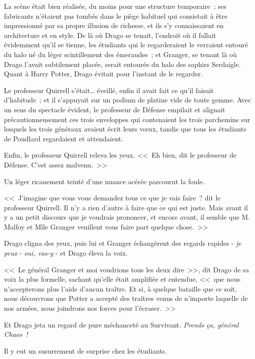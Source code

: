 \later

La scène était bien réalisée, du moins pour une structure temporaire~; ses fabricants n'étaient pas tombés dans le piège habituel qui consistait à être impressionné par sa propre illusion de richesse, et ils s'y connaissaient en architecture et en style. De là où Drago se tenait, l'endroit où il fallait évidemment qu'il se tienne, les étudiants qui le regarderaient le verraient entouré du halo né du léger scintillement des émeraudes~; et Granger, se tenant là où Drago l'avait subtilement placée, serait entourée du halo des saphirs Serdaigle. Quant à Harry Potter, Drago évitait pour l'instant de le regarder.

Le professeur Quirrell s'était… éveillé, enfin il avait fait ce qu'il faisait d'habitude~; et il s'appuyait sur un podium de platine vide de toute gemme. Avec un sens du spectacle évident, le professeur de Défense empilait et alignait précautionneusement ces trois enveloppes qui contenaient les trois parchemins sur lesquels les trois généraux avaient écrit leurs vœux, tandis que tous les étudiants de Poudlard regardaient et attendaient.

Enfin, le professeur Quirrell releva les yeux. <<~Eh bien, dit le professeur de Défense. C'est assez malvenu.~>>

Un léger ricanement teinté d'une nuance acérée parcourut la foule.

<<~J'imagine que vous vous demandez tous ce que je vais faire~? dit le professeur Quirrell. Il n'y a rien d'autre à faire que ce qui est juste. Mais avant il y a un petit discours que je voudrais prononcer, et encore avant, il semble que M. Malfoy et Mlle Granger veuillent vous faire part quelque chose.~>>

Drago cligna des yeux, puis lui et Granger échangèrent des regards rapides - \emph{je peux} - \emph{oui, vas-y} - et Drago éleva la voix.

<<~Le général Granger et moi voudrions tous les deux dire~>>, dit Drago de sa voix la plus formelle, sachant qu'elle était amplifiée et entendue, <<~que nous n'accepterons plus l'aide d'aucun traître. Et si, à quelque bataille que ce soit, nous découvrons que Potter a accepté des traîtres venus de n'importe laquelle de nos armées, nous joindrons nos forces pour l'écraser.~>>

Et Drago jeta un regard de pure méchanceté au Survivant. \emph{Prends ça, général Chaos~!}

Il y eut un susurrement de surprise chez les étudiants.

